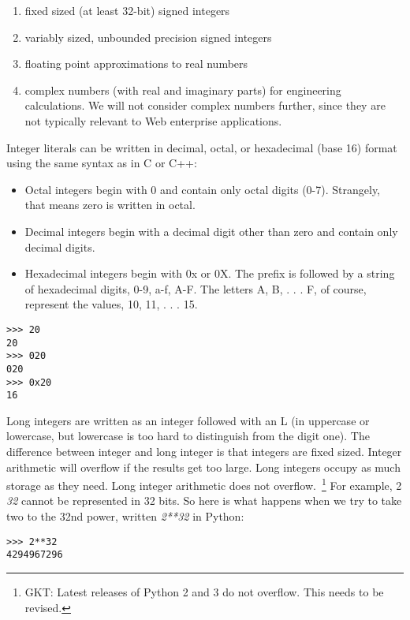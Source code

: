 \begin{enumerate}
\item fixed sized (at least 32-bit) signed integers
\item variably sized, unbounded precision signed integers
\item floating point approximations to real numbers
\item complex numbers (with real and imaginary parts) for engineering calculations. We will not consider complex numbers further, since they are not typically relevant to Web enterprise applications.
\end{enumerate}

Integer literals can be written in
decimal, octal, or hexadecimal (base 16) format using the same syntax as
in C or C++:

\begin{itemize}

\item
  Octal integers begin with 0 and
  contain only octal digits (0-7). Strangely, that means zero is written
  in octal.
\item
  Decimal integers begin with a
  decimal digit other than zero and contain only decimal digits.
\item
  Hexadecimal integers begin with
  0x or 0X. The prefix is followed by a string of hexadecimal digits,
  0-9, a-f, A-F. The letters A, B, . . . F, of course, represent the
  values, 10, 11, . . . 15.
\end{itemize}


\begin{verbatim}
>>> 20
20
>>> 020
020
>>> 0x20
16
\end{verbatim}

Long integers are written as an
integer followed with an L (in uppercase or lowercase, but lowercase is too
hard to distinguish from the digit one). The difference between integer
and long integer is that integers are fixed sized. Integer arithmetic
will overflow if the results get too large. Long integers occupy as much
storage as they need. Long integer arithmetic does not overflow.~\footnote{GKT: Latest releases of Python 2 and 3 do not overflow. This needs to be revised.} For
example, 2 \emph{32} cannot be represented in 32 bits. So here is what
happens when we try to take two to the 32nd power, written \emph{2**32}
in Python:


\begin{verbatim}
>>> 2**32
4294967296
\end{verbatim}


